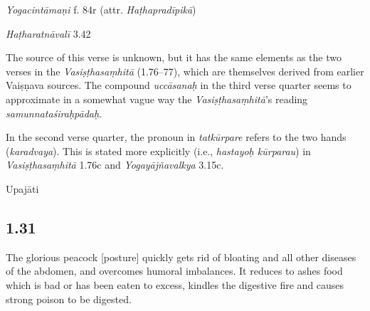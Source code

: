 \begin{ekdosis}
\begin{sources}[hp01_030]
\end{sources}

\begin{testimonia}[hp01_030]
\emph{Yogacintāmaṇi} f. 84r (attr. \emph{Haṭhapradīpikā})

\begin{versinnote}
\end{versinnote}

\emph{Haṭharatnāvalī} 3.42

\begin{versinnote}
\end{versinnote}

\end{testimonia}

\begin{philcomm}[hp01_030]
The source of this verse is unknown, but it has the same elements as the two verses in the \emph{Vasiṣṭhasaṃhitā} (1.76–77), which are themselves derived from earlier Vaiṣṇava sources. The compound \emph{uccāsanaḥ} in the third verse quarter seems to approximate in a somewhat vague way the \emph{Vasiṣṭhasaṃhitā}’s reading \emph{samunnataśiraḥpādaḥ}. 
 
In the second verse quarter, the pronoun in \emph{tatkūrpare} refers to the two hands (\emph{karadvaya}). This is stated more explicitly (i.e., \emph{hastayoḥ kūrparau}) in \emph{Vasiṣṭhasaṃhitā} 1.76c and \emph{Yogayājñavalkya} 3.15c.
\end{philcomm}

\begin{metre}[hp01_030]
Upajāti
\end{metre}

\subsection*{1.31}
\begin{translation}[hp01_031]
The glorious peacock [posture] quickly gets rid of bloating and all other diseases of the abdomen, and overcomes humoral imbalances. It reduces to ashes food which is bad or has been eaten to excess, kindles the digestive fire and causes strong poison to be digested.
\end{translation}


\end{ekdosis}

